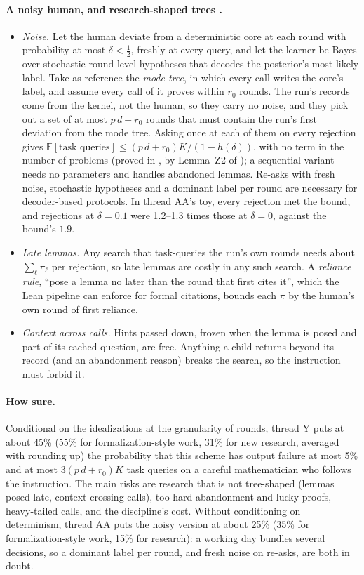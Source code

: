 \documentclass[11pt]{article}
\theoremstyle{definition}
\theoremstyle{remark}
\newcommand{\K}{K}
\newcommand{\Ex}{\mathbb{E}}
\begin{document}
\paragraph{A noisy human, and research-shaped trees \cite{threadAA}.}
\begin{itemize}[nosep]
\item \emph{Noise.} Let the human deviate from a deterministic core at each round with probability at most $\delta<\frac12$, freshly at every query, and let the learner be Bayes over stochastic round-level hypotheses that decodes the posterior's most likely label. Take as reference the \emph{mode tree}, in which every call writes the core's label, and assume every call of it proves within $r_0$ rounds. The run's records come from the kernel, not the human, so they carry no noise, and they pick out a set of at most $p\,d+r_0$ rounds that must contain the run's first deviation from the mode tree. Asking once at each of them on every rejection gives $\Ex[\text{task queries}]\le(p\,d+r_0)\K/(1-h(\delta))$, with no term in the number of problems (proved in \cite{threadAA}, by Lemma~Z2 of \cite{threadZ}); a sequential variant needs no parameters and handles abandoned lemmas. Re-asks with fresh noise, stochastic hypotheses and a dominant label per round are necessary for decoder-based protocols. In thread AA's toy, every rejection met the bound, and rejections at $\delta=0.1$ were 1.2--1.3 times those at $\delta=0$, against the bound's $1.9$.
\item \emph{Late lemmas.} Any search that task-queries the run's own rounds needs about $\sum_\ell\pi_\ell$ per rejection, so late lemmas are costly in any such search. A \emph{reliance rule}, ``pose a lemma no later than the round that first cites it'', which the Lean pipeline can enforce for formal citations, bounds each $\pi$ by the human's own round of first reliance.
\item \emph{Context across calls.} Hints passed down, frozen when the lemma is posed and part of its cached question, are free. Anything a child returns beyond its record (and an abandonment reason) breaks the search, so the instruction must forbid it.
\end{itemize}

\paragraph{How sure.} Conditional on the idealizations at the granularity of rounds, thread Y puts at about 45\% (55\% for formalization-style work, 31\% for new research, averaged with rounding up) the probability that this scheme has output failure at most 5\% and at most $3(p\,d+r_0)\K$ task queries on a careful mathematician who follows the instruction. The main risks are research that is not tree-shaped (lemmas posed late, context crossing calls), too-hard abandonment and lucky proofs, heavy-tailed calls, and the discipline's cost. Without conditioning on determinism, thread AA puts the noisy version at about 25\% (35\% for formalization-style work, 15\% for research): a working day bundles several decisions, so a dominant label per round, and fresh noise on re-asks, are both in doubt.
\end{document}
